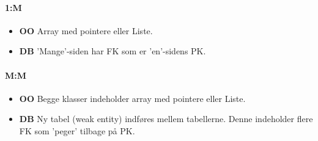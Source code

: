 \paragraph{1:M}

\begin{itemize}
	\item \textbf{OO}
	Array med pointere eller Liste.
	\item \textbf{DB}
	'Mange'-siden har FK som er 'en'-sidens PK.
\end{itemize}

\paragraph{M:M}

\begin{itemize}
	\item \textbf{OO}
	Begge klasser indeholder array med pointere eller Liste.
	\item \textbf{DB}
	Ny tabel (weak entity) indføres mellem tabellerne. Denne indeholder flere FK som 'peger' tilbage på PK.
\end{itemize}

%
%
%
%
%

